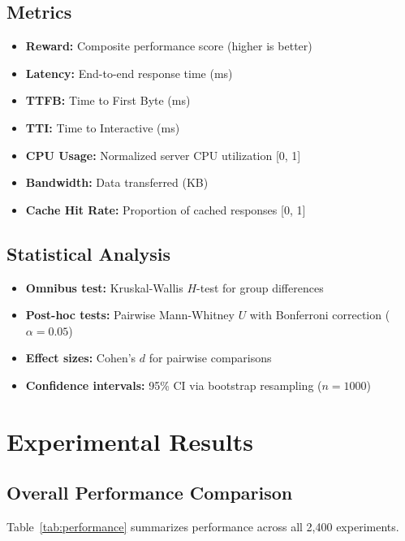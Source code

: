 \documentclass[10pt,twocolumn]{article}
\begin{document}
\subsection{Metrics}

\begin{itemize}[nosep]
\item \textbf{Reward:} Composite performance score (higher is better)
\item \textbf{Latency:} End-to-end response time (ms)
\item \textbf{TTFB:} Time to First Byte (ms)
\item \textbf{TTI:} Time to Interactive (ms)
\item \textbf{CPU Usage:} Normalized server CPU utilization [0, 1]
\item \textbf{Bandwidth:} Data transferred (KB)
\item \textbf{Cache Hit Rate:} Proportion of cached responses [0, 1]
\end{itemize}

\subsection{Statistical Analysis}

\begin{itemize}[nosep]
\item \textbf{Omnibus test:} Kruskal-Wallis $H$-test for group differences
\item \textbf{Post-hoc tests:} Pairwise Mann-Whitney $U$ with Bonferroni correction ($\alpha = 0.05$)
\item \textbf{Effect sizes:} Cohen's $d$ for pairwise comparisons
\item \textbf{Confidence intervals:} 95\% CI via bootstrap resampling ($n = 1000$)
\end{itemize}

\section{Experimental Results}
\label{sec:results}

\subsection{Overall Performance Comparison}

Table~\ref{tab:performance} summarizes performance across all 2,400 experiments.
\end{document}
